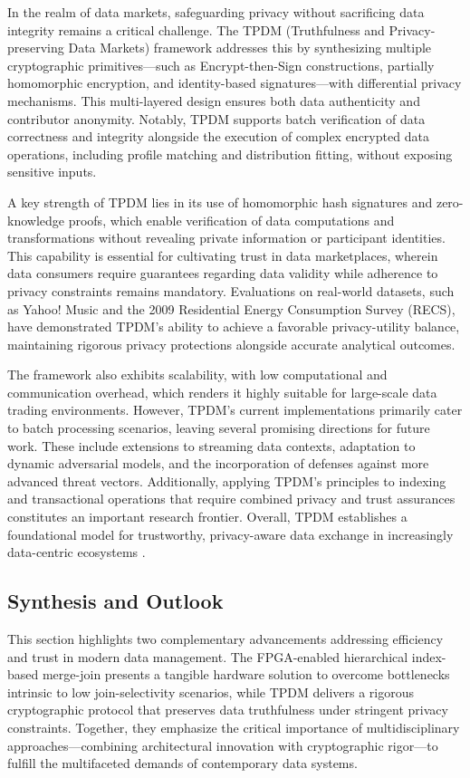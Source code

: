 \documentclass[sigconf]{acmart}
\begin{document}
In the realm of data markets, safeguarding privacy without sacrificing data integrity remains a critical challenge. The TPDM (Truthfulness and Privacy-preserving Data Markets) framework addresses this by synthesizing multiple cryptographic primitives—such as Encrypt-then-Sign constructions, partially homomorphic encryption, and identity-based signatures—with differential privacy mechanisms. This multi-layered design ensures both data authenticity and contributor anonymity. Notably, TPDM supports batch verification of data correctness and integrity alongside the execution of complex encrypted data operations, including profile matching and distribution fitting, without exposing sensitive inputs.

A key strength of TPDM lies in its use of homomorphic hash signatures and zero-knowledge proofs, which enable verification of data computations and transformations without revealing private information or participant identities. This capability is essential for cultivating trust in data marketplaces, wherein data consumers require guarantees regarding data validity while adherence to privacy constraints remains mandatory. Evaluations on real-world datasets, such as Yahoo! Music and the 2009 Residential Energy Consumption Survey (RECS), have demonstrated TPDM’s ability to achieve a favorable privacy-utility balance, maintaining rigorous privacy protections alongside accurate analytical outcomes.

The framework also exhibits scalability, with low computational and communication overhead, which renders it highly suitable for large-scale data trading environments. However, TPDM’s current implementations primarily cater to batch processing scenarios, leaving several promising directions for future work. These include extensions to streaming data contexts, adaptation to dynamic adversarial models, and the incorporation of defenses against more advanced threat vectors. Additionally, applying TPDM’s principles to indexing and transactional operations that require combined privacy and trust assurances constitutes an important research frontier. Overall, TPDM establishes a foundational model for trustworthy, privacy-aware data exchange in increasingly data-centric ecosystems \cite{ref25}.

\subsection{Synthesis and Outlook}

This section highlights two complementary advancements addressing efficiency and trust in modern data management. The FPGA-enabled hierarchical index-based merge-join presents a tangible hardware solution to overcome bottlenecks intrinsic to low join-selectivity scenarios, while TPDM delivers a rigorous cryptographic protocol that preserves data truthfulness under stringent privacy constraints. Together, they emphasize the critical importance of multidisciplinary approaches—combining architectural innovation with cryptographic rigor—to fulfill the multifaceted demands of contemporary data systems.
\end{document}
